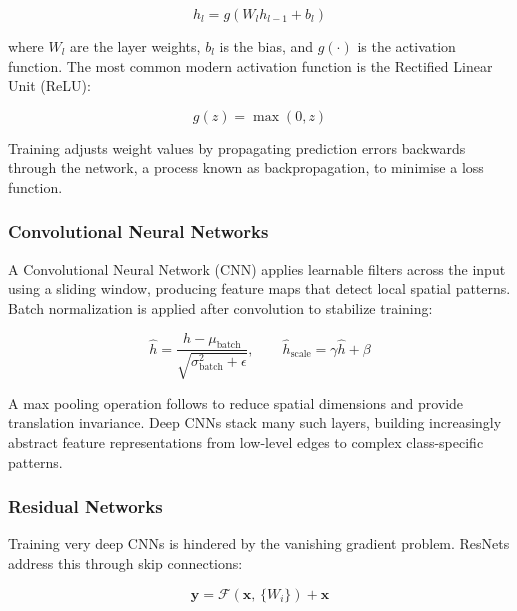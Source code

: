 \documentclass[12pt, letterpaper]{article}
\begin{document}
\begin{equation}
    h_l = g(W_l h_{l-1} + b_l)
    \label{eq:neuron}
\end{equation}

where $W_l$ are the layer weights, $b_l$ is the bias, and $g(\cdot)$ is the activation
function. The most common modern activation function is the Rectified Linear Unit (ReLU):

\begin{equation}
    g(z) = \max(0, z)
    \label{eq:relu}
\end{equation}

Training adjusts weight values by propagating prediction errors backwards through the
network, a process known as backpropagation, to minimise a loss function.

\subsubsection{Convolutional Neural Networks}

A Convolutional Neural Network (CNN) applies learnable filters across the input using a sliding window, producing feature maps that detect local spatial patterns. Batch normalization \cite{ioffe2015batch} is applied after convolution to stabilize training:

\begin{equation}
    \hat{h} = \frac{h - \mu_{\text{batch}}}{\sqrt{\sigma_{\text{batch}}^2 + \epsilon}},
    \qquad
    \hat{h}_{\text{scale}} = \gamma \hat{h} + \beta
    \label{eq:bn}
\end{equation}

A max pooling operation follows to reduce spatial dimensions and provide translation invariance. Deep CNNs stack many such layers, building increasingly abstract feature representations from low-level edges to complex class-specific patterns.

\subsubsection{Residual Networks}

Training very deep CNNs is hindered by the vanishing gradient problem. ResNets
\cite{he2016resnet} address this through skip connections:

\begin{equation}
    \mathbf{y} = \mathcal{F}(\mathbf{x},\, \{W_i\}) + \mathbf{x}
    \label{eq:resnet}
\end{equation}
\end{document}
